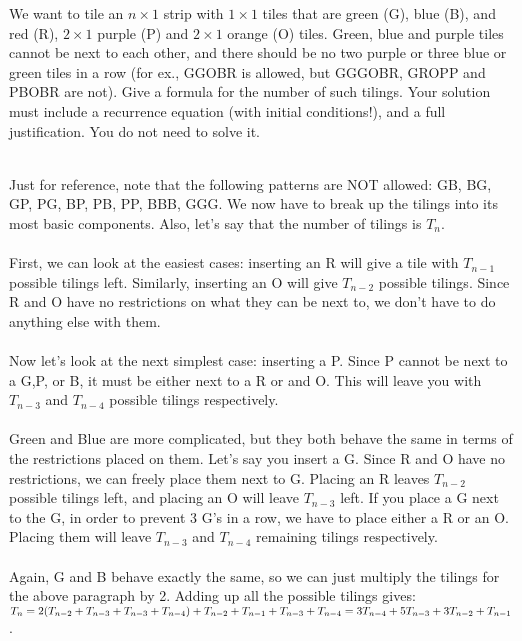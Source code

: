 \documentclass[11pt]{article}
\begin{document}
\newpage
\begin{problem}
	We want to tile an $n\times 1$ strip with $1\times 1$ tiles that are green (G), blue (B), and red (R), $2\times 1$ purple (P) and $2\times 1$ orange (O) tiles. Green, blue and purple tiles cannot be next to each other, and there should be no two purple or three blue or green tiles in a row (for ex., GGOBR is allowed, but GGGOBR, GROPP and PBOBR are not). Give a formula for the number of such tilings. Your solution must include a recurrence equation (with initial conditions!), and a full justification. You do not need to solve it. 
\end{problem}

\begin{solution}
	\\   Just for reference, note that the following patterns are NOT allowed: GB, BG, GP, PG, BP, PB, PP, BBB, GGG. We now have to break up the tilings into its most basic components. Also, let's say that the number of tilings is $T_n$. 
	\\\\ First, we can look at the easiest cases: inserting an R will give a tile with $T_{n-1}$ possible tilings left. Similarly, inserting an O will give $T_{n-2}$ possible tilings. Since R and O have no restrictions on what they can be next to, we don't have to do anything else with them. 
	\\\\ Now let's look at the next simplest case: inserting a P. Since P cannot be next to a G,P, or B, it must be either next to a R or and O. This will leave you with $T_{n-3}$ and $T_{n-4}$ possible tilings respectively. 
	\\\\ Green and Blue are more complicated, but they both behave the same in terms of the restrictions placed on them. Let's say you insert a G. Since R and O have no restrictions, we can freely place them next to G. Placing an R leaves $T_{n-2}$ possible tilings left, and placing an O will leave $T_{n-3}$ left. If you place a G next to the G, in order to prevent 3 G's in a row, we have to place either a R or an O. Placing them will leave $T_{n-3}$ and $T_{n-4}$ remaining tilings respectively. 
	\\\\ Again, G and B behave exactly the same, so we can just multiply the tilings for the above paragraph by 2. Adding up all the possible tilings gives: \\ $T_n = 2(T_{n-2} + T_{n-3} + T_{n-3} + T_{n-4}) + T_{n-2} + T_{n-1} + T_{n-3} + T_{n-4} \\ =  3T_{n-4} + 5T_{n-3} + 3T_{n-2} + T_{n-1}$.

\end{solution}
\end{document}
